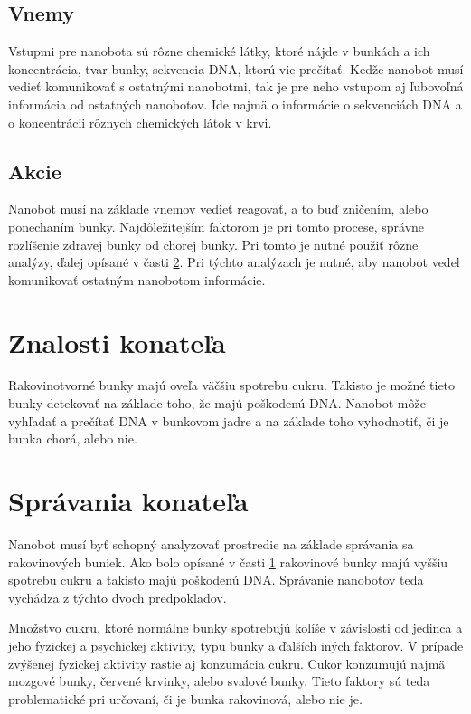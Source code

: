 \documentclass[10pt,twoside,slovak,a4paper]{article}
\begin{document}
\subsection{Vnemy}
Vstupmi pre nanobota sú rôzne chemické látky, ktoré nájde v bunkách a ich koncentrácia, tvar bunky, sekvencia DNA, ktorú vie prečítať. Keďže nanobot musí vedieť komunikovať s ostatnými nanobotmi, tak je pre neho vstupom aj ľubovoľná informácia od ostatných nanobotov. Ide najmä o informácie o sekvenciách DNA a o koncentrácii rôznych chemických látok v krvi.

\subsection{Akcie}
Nanobot musí na základe vnemov vedieť reagovať, a to buď zničením, alebo ponechaním bunky. Najdôležitejším faktorom je pri tomto procese, správne rozlíšenie zdravej bunky od chorej bunky. Pri tomto je nutné použiť rôzne analýzy, ďalej opísané v časti \ref{sec:spravanie}. Pri týchto analýzach je nutné, aby nanobot vedel komunikovať ostatným nanobotom informácie.


\section{Znalosti konateľa}
\label{sec:znalosti}
Rakovinotvorné bunky majú oveľa väčšiu spotrebu cukru. Takisto je možné tieto bunky detekovať na základe toho, že majú poškodenú DNA. Nanobot môže vyhľadať a prečítať DNA v bunkovom jadre a na základe toho vyhodnotiť, či je bunka chorá, alebo nie.
\cite{Wikipedia-nador,cancer-cell-metabolism}

\section{Správania konateľa}
\label{sec:spravanie}
Nanobot musí byť schopný analyzovať prostredie na základe správania sa rakovinových buniek. Ako bolo opísané v časti \ref{sec:znalosti} rakovinové bunky majú vyššiu spotrebu cukru a takisto majú poškodenú DNA. Správanie nanobotov teda vychádza z týchto dvoch predpokladov.

Množstvo cukru, ktoré normálne bunky spotrebujú kolíše v závislosti od jedinca a jeho fyzickej a psychickej aktivity, typu bunky a ďalších iných faktorov. V prípade zvýšenej fyzickej aktivity rastie aj konzumácia cukru. Cukor konzumujú najmä mozgové bunky, červené krvinky, alebo svalové bunky. Tieto faktory sú teda problematické pri určovaní, či je bunka rakovinová, alebo nie je.
\end{document}

